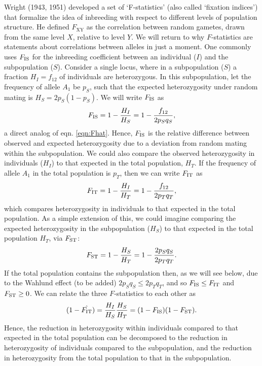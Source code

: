 Wright (1943, 1951) developed a set of `F-statistics' (also called `fixation indices') that formalize the idea
of inbreeding with respect to different levels of population structure. He defined $F_{\mathrm{XY}}$ as
the correlation between random gametes, drawn from the same level $X$,
relative to level $Y$. We will return to why $F$-statistics are statements
about correlations between alleles in just a moment. One commonly uses $F_{\mathrm{IS}}$ for the inbreeding
coefficient between an individual ($I$) and the subpopulation
($S$). Consider a single locus, where in a subpopulation ($S$) a fraction $H_I=f_{12}$ of individuals
are heterozygous. In this subpopulation, let the frequency of
allele $A_1$ be $p_S$, such that the expected heterozygosity under random mating is $H_S = 2 p_S (1 - p_S)$. We will write $F_{\mathrm{IS}}$ as
\begin{equation}
F_{\mathrm{IS}} = 1-\frac{H_I}{H_S}= 1-\frac{f_{12}}{2p_Sq_S},
\label{eqn:FIS}
\end{equation}
a direct analog of eqn. \ref{eqn:Fhat}. Hence, $F_{\mathrm{IS}}$ is the relative difference between observed and expected heterozygosity due to a deviation from random mating within the subpopulation. We could also compare the observed
heterozygosity in individuals ($H_I$) to that expected in the total
population, $H_T$. If the frequency of allele $A_1$ in the total
population is $p_T$, then we can write $F_{\mathrm{IT}}$ as
\begin{equation}
F_{\mathrm{IT}} =1-\frac{H_I}{H_T}= 1-\frac{f_{12}}{2p_Tq_T},
\label{eqn:FIT}
\end{equation}
which compares heterozygosity in individuals to that expected in the
total population. As a simple extension of this, we could imagine
comparing the expected heterozygosity in the subpopulation ($H_S$) to
that expected in the total population $H_T$, via $F_{\mathrm{ST}}$:
\begin{equation}
F_{\mathrm{ST}} = 1-\frac{H_S}{H_T}=1-\frac{2p_Sq_S}{2p_Tq_T} \label{eqn:FST}.
\end{equation}
If the total population contains the subpopulation then, as we will see
below, due to the Wahlund effect (to be added)
 $2p_Sq_S \leq
2p_Tq_T$, and so $F_{\mathrm{IS}} \leq F_{\mathrm{IT}}$ and $F_{\mathrm{ST}} \geq 0$. We can
relate the three $F$-statistics to each other as
\begin{equation}
(1-\hat{F_{\mathrm{IT}}}) =\frac{H_I}{H_S} \frac{H_S}{H_T}=(1-F_{\mathrm{IS}})(1-F_{\mathrm{ST}}).
\label{eqn:F_relationships}
\end{equation}
Hence, the reduction in heterozygosity within individuals compared to that expected
in the total population can be decomposed to the reduction in
heterozygosity of individuals compared to the subpopulation, and the reduction in
heterozygosity from the total population to that in the subpopulation.\\

